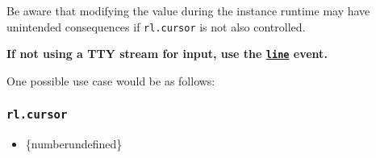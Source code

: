 Be aware that modifying the value during the instance runtime may have
unintended consequences if \texttt{rl.cursor} is not also controlled.

\textbf{If not using a TTY stream for input, use the
\hyperref[event-line]{\texttt{\textquotesingle{}line\textquotesingle{}}}
event.}

One possible use case would be as follows:

\begin{Shaded}
\begin{Highlighting}[]
\OperatorTok{=}\NormalTok{ [}\OperatorTok{,} \NormalTok{]}\OperatorTok{;}
\OperatorTok{=}\NormalTok{(}\NormalTok{)}\OperatorTok{;}
\OperatorTok{=} \NormalTok{(() }\KeywordTok{=\textgreater{}}\NormalTok{ \{}
  \NormalTok{(}
    \StringTok{\textquotesingle{}}\StringTok{\textquotesingle{}}\OperatorTok{,}
\KeywordTok{=\textgreater{}}\NormalTok{))}\NormalTok{(}\StringTok{\textquotesingle{} \textquotesingle{}}\NormalTok{)}\OperatorTok{,}
\NormalTok{  )}\OperatorTok{;}
\NormalTok{\}}\OperatorTok{,} \NormalTok{)}\OperatorTok{;}
\NormalTok{(}\OperatorTok{,}\OperatorTok{,}\KeywordTok{=\textgreater{}}\NormalTok{ \{}
  \NormalTok{()}\OperatorTok{;}
\NormalTok{\})}\OperatorTok{;}
\end{Highlighting}
\end{Shaded}

\subsubsection{\texorpdfstring{\texttt{rl.cursor}}{rl.cursor}}\label{rl.cursor}

\begin{itemize}
\tightlist
\item
  \{number\textbar undefined\}
\end{itemize}


